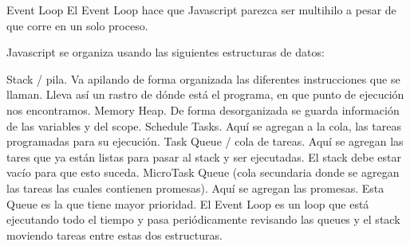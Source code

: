 Event Loop
El Event Loop hace que Javascript parezca ser multihilo a pesar de que corre en un solo proceso.

Javascript se organiza usando las siguientes estructuras de datos:

Stack / pila. Va apilando de forma organizada las diferentes instrucciones que se llaman.
              Lleva así un rastro de dónde está el programa, en que punto de ejecución nos encontramos.
Memory Heap. De forma desorganizada se guarda información de las variables y del scope.
Schedule Tasks. Aquí se agregan a la cola, las tareas programadas para su ejecución.
Task Queue / cola de tareas. Aquí se agregan las tares que ya están listas para pasar al stack y ser ejecutadas.
                             El stack debe estar vacío para que esto suceda.
MicroTask Queue (cola secundaria donde se agregan las tareas las cuales contienen promesas). Aquí se agregan las promesas.
                Esta Queue es la que tiene mayor prioridad.
El Event Loop es un loop que está ejecutando todo el tiempo y pasa periódicamente revisando las queues y el stack moviendo tareas entre estas dos estructuras.